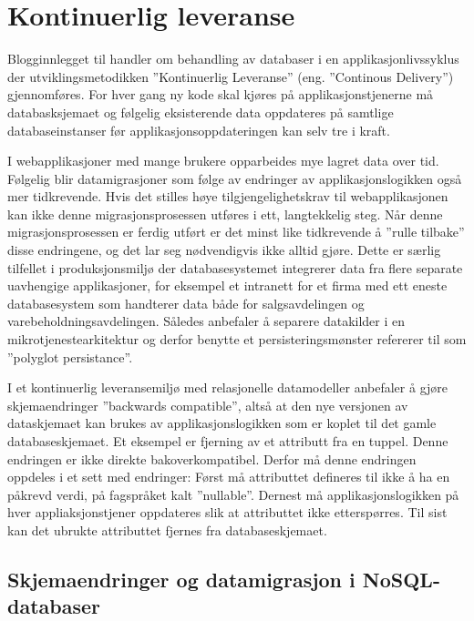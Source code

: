 \section{Kontinuerlig leveranse}

Blogginnlegget til \cite{hauer2015} handler om behandling av databaser i en applikasjonlivssyklus der utviklingsmetodikken ''Kontinuerlig Leveranse'' (eng. ''Continous Delivery'') gjennomføres. For hver gang ny kode skal kjøres på applikasjonstjenerne må databasksjemaet og følgelig eksisterende data oppdateres på samtlige databaseinstanser før applikasjonsoppdateringen kan selv tre i kraft.

I webapplikasjoner med mange brukere opparbeides mye lagret data over tid. Følgelig blir datamigrasjoner som følge av endringer av applikasjonslogikken også mer tidkrevende. Hvis det stilles høye tilgjengelighetskrav til webapplikasjonen kan ikke denne migrasjonsprosessen utføres i ett, langtekkelig steg. Når denne migrasjonsprosessen er ferdig utført er det minst like tidkrevende å ''rulle tilbake'' disse endringene, og det lar seg nødvendigvis ikke alltid gjøre. Dette er særlig tilfellet i produksjonsmiljø der databasesystemet integrerer data fra flere separate uavhengige applikasjoner, for eksempel et intranett for et firma med ett eneste databasesystem som handterer data både for salgsavdelingen og varebeholdningsavdelingen. Således anbefaler \cite{hauer2015} å separere datakilder i en mikrotjenestearkitektur og derfor benytte et persisteringsmønster \cite{sadalage2013} refererer til som ''polyglot persistance''.

I et kontinuerlig leveransemiljø med relasjonelle datamodeller anbefaler \cite{hauer2015} å gjøre skjemaendringer ''backwards compatible'', altså at den nye versjonen av dataskjemaet kan brukes av applikasjonslogikken som er koplet til det gamle databaseskjemaet. Et eksempel er fjerning av et attributt fra en tuppel. Denne endringen er ikke direkte bakoverkompatibel. Derfor må denne endringen oppdeles i et sett med endringer: Først må attributtet defineres til ikke å ha en påkrevd verdi, på fagspråket kalt ''nullable''. Dernest må applikasjonslogikken på hver appliaksjonstjener oppdateres slik at attributtet ikke etterspørres. Til sist kan det ubrukte attributtet fjernes fra databaseskjemaet.

\subsection{Skjemaendringer og datamigrasjon i NoSQL-databaser}

